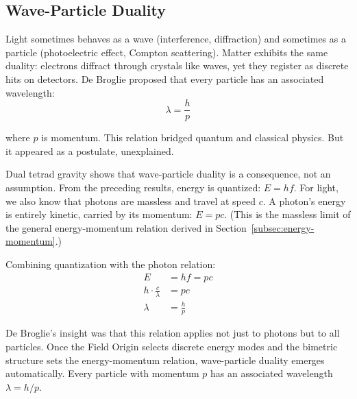 \documentclass[aps,prd,preprint,superscriptaddress,showpacs,preprintnumbers,amsmath,amssymb,nofootinbib]{revtex4-2}
\begin{document}
\subsection{Wave-Particle Duality}
\label{subsec:debroglie}

Light sometimes behaves as a wave (interference, diffraction) and sometimes as a particle (photoelectric effect, Compton scattering). Matter exhibits the same duality: electrons diffract through crystals like waves, yet they register as discrete hits on detectors. De Broglie proposed that every particle has an associated wavelength:
\begin{equation}
\lambda = \frac{h}{p}
\end{equation}

where $p$ is momentum. This relation bridged quantum and classical physics. But it appeared as a postulate, unexplained.

Dual tetrad gravity shows that wave-particle duality is a consequence, not an assumption. From the preceding results, energy is quantized: $E = hf$. For light, we also know that photons are massless and travel at speed $c$. A photon's energy is entirely kinetic, carried by its momentum: $E = pc$. (This is the massless limit of the general energy-momentum relation derived in Section~\ref{subsec:energy-momentum}.)

Combining quantization with the photon relation:
\begin{align}
E &= hf = pc \\
h \cdot \frac{c}{\lambda} &= pc \\
\lambda &= \frac{h}{p}
\end{align}

De Broglie's insight was that this relation applies not just to photons but to all particles. Once the Field Origin selects discrete energy modes and the bimetric structure sets the energy-momentum relation, wave-particle duality emerges automatically. Every particle with momentum $p$ has an associated wavelength $\lambda = h/p$.

\vspace{1em}
\noindent
{}
\vspace{1cm}
\end{document}

